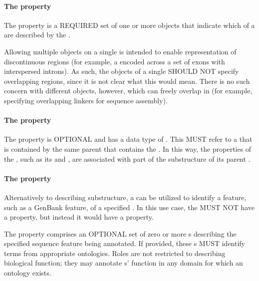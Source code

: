 \paragraph{The  property}\label{sec:locations}
The  property is a REQUIRED set of one or more  objects that indicate which  of a  are described by the .

Allowing multiple  objects on a single  is intended to enable representation of discontinuous regions (for example, a  encoded across a set of exons with interspersed introns).
As such, the  objects of a single  SHOULD NOT specify overlapping regions, since it is not clear what this would mean.
There is no such concern with different  objects, however, which can freely overlap in  (for example, specifying overlapping linkers for sequence assembly).

\paragraph{The  property}\label{sec:component}
The  property is OPTIONAL and has a data type of . This  MUST refer to a  that is contained by the same parent  that contains the . In this way, the properties of the , such as its  and , are associated with part of the substructure of its parent .


\paragraph{The  property}\label{sec:roles:SA}

Alternatively to describing substructure, a  can be utilized to identify a feature, such as a GenBank feature, of a specified .  In this use case, the  MUST NOT have a  property, but instead it would have a  property.  

The  property comprises an OPTIONAL set of zero or more s describing the specified sequence feature being annotated.  If provided, these  s MUST identify terms from appropriate ontologies. Roles are not restricted to describing biological function; they may annotate s' function in any domain for which an ontology exists.

